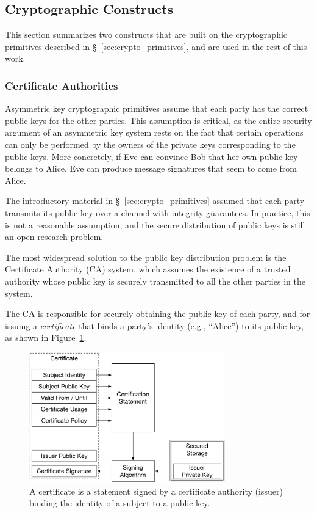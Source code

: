 \subsection{Cryptographic Constructs}
\label{sec:crypto_constructs}

This section summarizes two constructs that are built on the cryptographic
primitives described in \S~\ref{sec:crypto_primitives}, and are used in the
rest of this work.


\subsubsection{Certificate Authorities}
\label{sec:certificates}

Asymmetric key cryptographic primitives assume that each party has the correct
public keys for the other parties. This assumption is critical, as the entire
security argument of an asymmetric key system rests on the fact that certain
operations can only be performed by the owners of the private keys
corresponding to the public keys. More concretely, if Eve can convince Bob
that her own public key belongs to Alice, Eve can produce message signatures
that seem to come from Alice.

The introductory material in \S~\ref{sec:crypto_primitives} assumed that each
party transmits its public key over a channel with integrity guarantees. In
practice, this is not a reasonable assumption, and the secure distribution of
public keys is still an open research problem.

The most widespread solution to the public key distribution problem is the
Certificate Authority (CA) system, which assumes the existence of a trusted
authority whose public key is securely transmitted to all the other parties in
the system.

The CA is responsible for securely obtaining the public key of each party, and
for issuing a \textit{certificate} that binds a party's identity (e.g.,
``Alice'') to its public key, as shown in Figure~\ref{fig:certificate}.

\begin{figure}[hbt]
  \centering
  \includegraphics[width=85mm]{figures/certificate.pdf}
  \caption{
    A certificate is a statement signed by a certificate authority (issuer)
    binding the identity of a subject to a public key.
  }
  \label{fig:certificate}
\end{figure}

